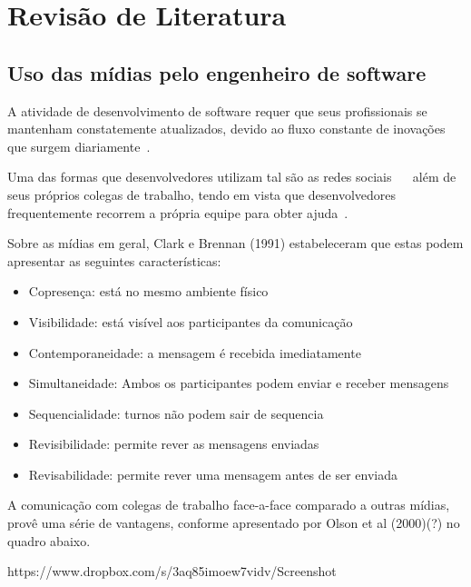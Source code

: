 \chapter{Revisão de Literatura}

\section{Uso das mídias pelo engenheiro de software}

A atividade de desenvolvimento de software requer que seus profissionais se mantenham constatemente atualizados, devido ao fluxo constante de inovações que surgem diariamente~\cite{Singer2014}.

Uma das formas que desenvolvedores utilizam tal são as redes sociais ~\cite{Treude2012}~\cite{Storey2014} além de seus próprios colegas de trabalho, tendo em vista que desenvolvedores frequentemente recorrem a própria equipe para obter ajuda~\cite{Weinberg1998}.


Sobre as mídias em geral, Clark e Brennan (1991) estabeleceram que estas podem apresentar as seguintes características:

\begin{itemize}
  \item Copresença: está no mesmo ambiente físico
  \item Visibilidade: está visível aos participantes da comunicação
  \item Contemporaneidade: a mensagem é recebida imediatamente
  \item Simultaneidade: Ambos os participantes podem enviar e receber mensagens
  \item Sequencialidade: turnos não podem sair de sequencia
  \item Revisibilidade: permite rever as mensagens enviadas
  \item Revisabilidade: permite rever uma mensagem antes de ser enviada
\end{itemize}

A comunicação com colegas de trabalho face-a-face comparado a outras mídias, provê uma série de vantagens, conforme apresentado por Olson et al (2000)(?) no quadro abaixo.

https://www.dropbox.com/s/3aq85imoew7vidv/Screenshot%

